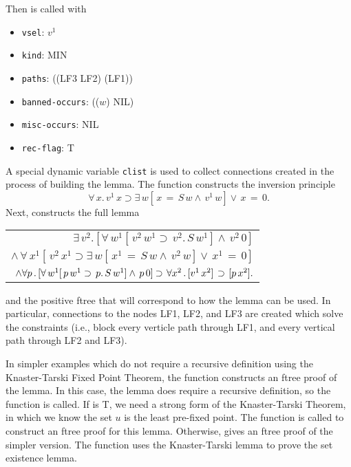 Then  is called with
\begin{itemize}
\item \verb+vsel+: $v^1$
\item \verb+kind+: MIN
\item \verb+paths+: ((LF3 LF2) (LF1))
\item \verb+banned-occurs+: (($w$) NIL)
\item \verb+misc-occurs+: NIL
\item \verb+rec-flag+: T
\end{itemize}
A special dynamic variable \verb+clist+ is used to collect connections
created in the process of building the lemma.
The function  constructs the inversion principle
$$\forall \,x . \,v^1 \,x \supset \exists \,w [ \,x \,= \,S \,w \land \,v^1 \,w] \lor \,x \,= \,0.$$
Next,  constructs the full lemma \
\begin{center}
\begin{tabular}{r}
$ \exists \,v^2 . [\forall \,w^1 [ \,v^2 \,w^1 \supset \,v^2 . \,S \,w^1 ] \land \,v^2 \,0]$ \\
$\land\,\forall \,x^1 [ \,v^2 \,x^1 \supset \exists \,w [ \,x^1 \,= \,S \,w \land \,v^2 \,w ] \lor \,x^1 \,= \,0 ]$ \\
$\land \forall p\, .\, [\forall \,w^1 [ \,p \,w^1 \supset \,p . \,S \,w^1 ] \land \,p \,0]
\mathbin{\supset}\, \forall x^2\, . \, [v^1\, x^2]\,\mathbin{\supset}\, [p\, x^2].$  \\
\end{tabular}
\end{center}
and the positive ftree that will correspond to how the lemma can be used.
In particular, connections to the nodes LF1, LF2, and LF3 are created
which solve the constraints (i.e., block every verticle path through LF1,
and every vertical path through LF2 and LF3).

In simpler examples which do not require a recursive definition
using the Knaster-Tarski Fixed Point Theorem,
the function 
constructs an ftree proof of the lemma.
In this case, the lemma does require a recursive definition,
so the function 
is called.  If  is T,
we need a strong form of the Knaster-Tarski Theorem, in which
we know the set $u$ is the least pre-fixed point.
The function 
is called to construct an ftree proof for this lemma.
Otherwise, 
gives an ftree proof of the simpler version.
The function 
uses the Knaster-Tarski lemma to prove the set existence lemma.

